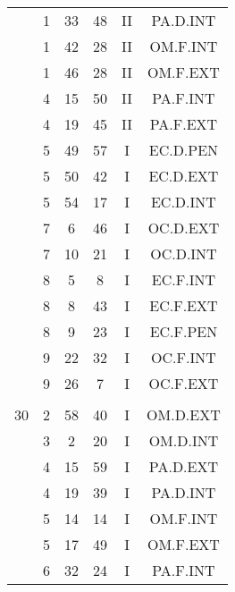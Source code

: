 \documentclass[12pt, a4paper]{article}
\begin{document}
\begin{multicols}{3}
{\begin{tabular}{c c c c c c}
	 	 	 	 & 1 & 33 & 48 & II & PA.D.INT\\%
	 	 	 	 & 1 & 42 & 28 & II & OM.F.INT\\%
	 	 	 	 & 1 & 46 & 28 & II & OM.F.EXT\\%
	 	 	 	 & 4 & 15 & 50 & II & PA.F.INT\\%
	 	 	 	 & 4 & 19 & 45 & II & PA.F.EXT\\%
	 	 	 	 & 5 & 49 & 57 & I & EC.D.PEN\\%
	 	 	 	 & 5 & 50 & 42 & I & EC.D.EXT\\%
	 	 	 	 & 5 & 54 & 17 & I & EC.D.INT\\%
	 	 	 	 & 7 & 6 & 46 & I & OC.D.EXT\\%
	 	 	 	 & 7 & 10 & 21 & I & OC.D.INT\\%
	 	 	 	 & 8 & 5 & 8 & I & EC.F.INT\\%
	 	 	 	 & 8 & 8 & 43 & I & EC.F.EXT\\%
	 	 	 	 & 8 & 9 & 23 & I & EC.F.PEN\\%
	 	 	 	 & 9 & 22 & 32 & I & OC.F.INT\\%
	 	 	 	 & 9 & 26 & 7 & I & OC.F.EXT\\%
	 	 	 	 & & & & & \\%
	 	 	 	30 & 2 & 58 & 40 & I & OM.D.EXT\\%
	 	 	 	 & 3 & 2 & 20 & I & OM.D.INT\\%
	 	 	 	 & 4 & 15 & 59 & I & PA.D.EXT\\%
	 	 	 	 & 4 & 19 & 39 & I & PA.D.INT\\%
	 	 	 	 & 5 & 14 & 14 & I & OM.F.INT\\%
	 	 	 	 & 5 & 17 & 49 & I & OM.F.EXT\\%
	 	 	 	 & 6 & 32 & 24 & I & PA.F.INT\\%

\end{tabular}}
\end{multicols}
\end{document}
